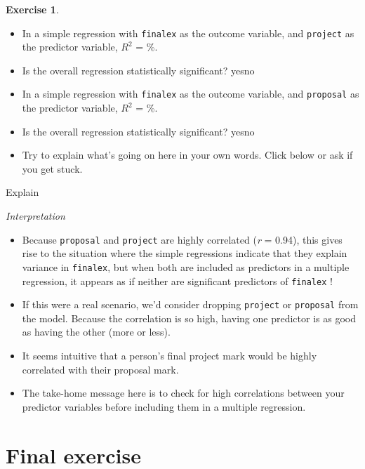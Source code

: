 \documentclass[
]{book}
\theoremstyle{definition}
\theoremstyle{definition}
\theoremstyle{definition}
\newtheorem{exercise}{Exercise}[chapter]
\theoremstyle{definition}
\theoremstyle{remark}
\begin{document}
\begin{exercise}
\begin{itemize}
\item
  In a simple regression with \texttt{finalex} as the outcome variable, and \texttt{project} as the predictor variable, \(R^2\) = \%.
\item
  Is the overall regression statistically significant? yesno
\item
  In a simple regression with \texttt{finalex} as the outcome variable, and \texttt{proposal} as the predictor variable, \(R^2\) = \%.
\item
  Is the overall regression statistically significant? yesno
\item
  Try to explain what's going on here in your own words. Click below or ask if you get stuck.
\end{itemize}

Explain

\emph{Interpretation}

\begin{itemize}
\item
  Because \texttt{proposal} and \texttt{project} are highly correlated (\emph{r} = 0.94), this gives rise to the situation where the simple regressions indicate that they explain variance in \texttt{finalex}, but when both are included as predictors in a multiple regression, it appears as if neither are significant predictors of \texttt{finalex} !
\item
  If this were a real scenario, we'd consider dropping \texttt{project} or \texttt{proposal} from the model. Because the correlation is so high, having one predictor is as good as having the other (more or less).
\item
  It seems intuitive that a person's final project mark would be highly correlated with their proposal mark.
\item
  The take-home message here is to check for high correlations between your predictor variables before including them in a multiple regression.
\end{itemize}

\end{exercise}

\hypertarget{final-exercise}{%
\section{Final exercise}\label{final-exercise}}
\end{document}
